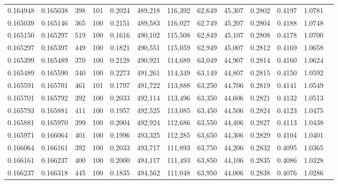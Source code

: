 \begin{tabular}{rrrrrrrrrrrrr}
0.164948 & 0.165038 &   398 & 101 &                                     0.2024 & 489,218 & 116,392 &  62,649 &  45,307 & 0.2802 & 0.4197 & 1.0781 \\
0.165039 & 0.165146 &   365 & 100 &                                     0.2151 & 489,583 & 116,027 &  62,749 &  45,207 & 0.2804 & 0.4188 & 1.0748 \\
0.165150 & 0.165297 &   519 & 100 &                                     0.1616 & 490,102 & 115,508 &  62,849 &  45,107 & 0.2808 & 0.4178 & 1.0700 \\
0.165297 & 0.165397 &   449 & 100 &                                     0.1821 & 490,551 & 115,059 &  62,949 &  45,007 & 0.2812 & 0.4169 & 1.0658 \\
0.165399 & 0.165489 &   370 & 100 &                                     0.2128 & 490,921 & 114,689 &  63,049 &  44,907 & 0.2814 & 0.4160 & 1.0624 \\
0.165489 & 0.165590 &   340 & 100 &                                     0.2273 & 491,261 & 114,349 &  63,149 &  44,807 & 0.2815 & 0.4150 & 1.0592 \\
0.165591 & 0.165701 &   461 & 101 &                                     0.1797 & 491,722 & 113,888 &  63,250 &  44,706 & 0.2819 & 0.4141 & 1.0549 \\
0.165701 & 0.165792 &   392 & 100 &                                     0.2033 & 492,114 & 113,496 &  63,350 &  44,606 & 0.2821 & 0.4132 & 1.0513 \\
0.165793 & 0.165881 &   411 & 100 &                                     0.1957 & 492,525 & 113,085 &  63,450 &  44,506 & 0.2824 & 0.4123 & 1.0475 \\
0.165881 & 0.165970 &   399 & 100 &                                     0.2004 & 492,924 & 112,686 &  63,550 &  44,406 & 0.2827 & 0.4113 & 1.0438 \\
0.165971 & 0.166064 &   401 & 100 &                                     0.1996 & 493,325 & 112,285 &  63,650 &  44,306 & 0.2829 & 0.4104 & 1.0401 \\
0.166064 & 0.166161 &   392 & 100 &                                     0.2033 & 493,717 & 111,893 &  63,750 &  44,206 & 0.2832 & 0.4095 & 1.0365 \\
0.166161 & 0.166237 &   400 & 100 &                                     0.2000 & 494,117 & 111,493 &  63,850 &  44,106 & 0.2835 & 0.4086 & 1.0328 \\
0.166237 & 0.166318 &   445 & 100 &                                     0.1835 & 494,562 & 111,048 &  63,950 &  44,006 & 0.2838 & 0.4076 & 1.0286 \\

\end{tabular}
